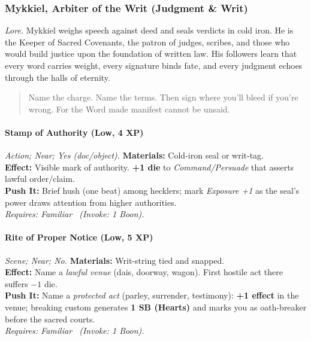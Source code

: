 \subsubsection{Mykkiel, Arbiter of the Writ (Judgment \& Writ)}
\textit{Lore.} Mykkiel weighs speech against deed and seals verdicts in cold iron. He is the Keeper of Sacred Covenants, the patron of judges, scribes, and those who would build justice upon the foundation of written law. His followers learn that every word carries weight, every signature binds fate, and every judgment echoes through the halls of eternity.

\begin{quote}
Name the charge. Name the terms. Then sign where you'll bleed if you're wrong. For the Word made manifest cannot be unsaid.
\end{quote}

\paragraph{Stamp of Authority (Low, 4 XP)} \emph{Action; Near; Yes (doc/object).}
\textbf{Materials:} Cold-iron seal or writ-tag.\\
\textbf{Effect:} Visible mark of authority. \textbf{+1 die} to \emph{Command/Persuade} that asserts lawful order/claim.\\
\textbf{Push It:} Brief hush (one beat) among hecklers; mark \emph{Exposure +1} as the seal's power draws attention from higher authorities.\\
\emph{Requires: Familiar \ (\textit{Invoke:} 1 Boon).}

\paragraph{Rite of Proper Notice (Low, 5 XP)} \emph{Scene; Near; No.}
\textbf{Materials:} Writ-string tied and snapped.\\
\textbf{Effect:} Name a \emph{lawful venue} (dais, doorway, wagon). First hostile act there suffers \(-1\) die.\\
\textbf{Push It:} Name a \emph{protected act} (parley, surrender, testimony): \textbf{+1 effect} in the venue; breaking custom generates \textbf{1 SB (Hearts)} and marks you as oath-breaker before the sacred courts.\\
\emph{Requires: Familiar \ (\textit{Invoke:} 1 Boon).}

